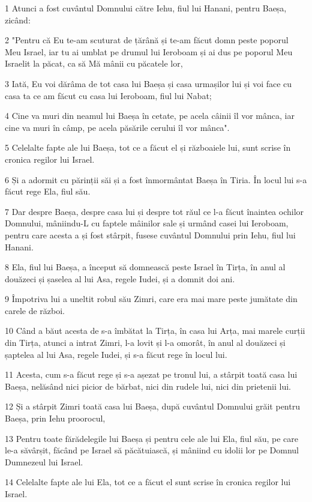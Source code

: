 \par 1 Atunci a fost cuvântul Domnului către Iehu, fiul lui Hanani, pentru Baeșa, zicând:
\par 2 "Pentru că Eu te-am scuturat de țărână și te-am făcut domn peste poporul Meu Israel, iar tu ai umblat pe drumul lui Ieroboam și ai dus pe poporul Meu Israelit la păcat, ca să Mă mânii cu păcatele lor,
\par 3 Iată, Eu voi dărâma de tot casa lui Baeșa și casa urmașilor lui și voi face cu casa ta ce am făcut cu casa lui Ieroboam, fiul lui Nabat;
\par 4 Cine va muri din neamul lui Baeșa în cetate, pe acela câinii îl vor mânca, iar cine va muri în câmp, pe acela păsările cerului îl vor mânca".
\par 5 Celelalte fapte ale lui Baeșa, tot ce a făcut el și războaiele lui, sunt scrise în cronica regilor lui Israel.
\par 6 Și a adormit cu părinții săi și a fost înmormântat Baeșa în Tiria. În locul lui s-a făcut rege Ela, fiul său.
\par 7 Dar despre Baeșa, despre casa lui și despre tot răul ce l-a făcut înaintea ochilor Domnului, mâniindu-L cu faptele mâinilor sale și urmând casei lui Ieroboam, pentru care acesta a și fost stârpit, fusese cuvântul Domnului prin Iehu, fiul lui Hanani.
\par 8 Ela, fiul lui Baeșa, a început să domnească peste Israel în Tirța, în anul al douăzeci și șaselea al lui Asa, regele Iudei, și a domnit doi ani.
\par 9 Împotriva lui a uneltit robul său Zimri, care era mai mare peste jumătate din carele de război.
\par 10 Când a băut acesta de s-a îmbătat la Tirța, în casa lui Arța, mai marele curții din Tirța, atunci a intrat Zimri, l-a lovit și l-a omorât, în anul al douăzeci și șaptelea al lui Asa, regele Iudei, și s-a făcut rege în locul lui.
\par 11 Acesta, cum s-a făcut rege și s-a așezat pe tronul lui, a stârpit toată casa lui Baeșa, nelăsând nici picior de bărbat, nici din rudele lui, nici din prietenii lui.
\par 12 Și a stârpit Zimri toată casa lui Baeșa, după cuvântul Domnului grăit pentru Baeșa, prin Iehu proorocul,
\par 13 Pentru toate fărădelegile lui Baeșa și pentru cele ale lui Ela, fiul său, pe care le-a săvârșit, făcând pe Israel să păcătuiască, și mâniind cu idolii lor pe Domnul Dumnezeul lui Israel.
\par 14 Celelalte fapte ale lui Ela, tot ce a făcut el sunt scrise în cronica regilor lui Israel.
